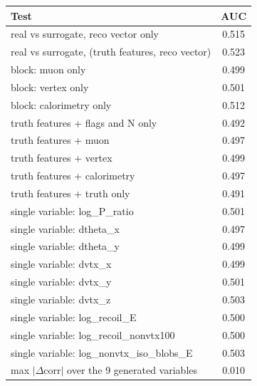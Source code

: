 \begin{tabular}{lc}
\toprule
Test & AUC \\
\midrule
real vs surrogate, reco vector only & 0.515 \\
real vs surrogate, (truth features, reco vector) & 0.523 \\
\midrule
block: muon only & 0.499 \\
block: vertex only & 0.501 \\
block: calorimetry only & 0.512 \\
truth features + flags and N only & 0.492 \\
truth features + muon & 0.497 \\
truth features + vertex & 0.499 \\
truth features + calorimetry & 0.497 \\
truth features + truth only & 0.491 \\
single variable: log\_P\_ratio & 0.501 \\
single variable: dtheta\_x & 0.497 \\
single variable: dtheta\_y & 0.499 \\
single variable: dvtx\_x & 0.499 \\
single variable: dvtx\_y & 0.501 \\
single variable: dvtx\_z & 0.503 \\
single variable: log\_recoil\_E & 0.500 \\
single variable: log\_recoil\_nonvtx100 & 0.500 \\
single variable: log\_nonvtx\_iso\_blobs\_E & 0.503 \\
\midrule
max $|\Delta$corr$|$ over the 9 generated variables & 0.010 \\
\bottomrule
\end{tabular}
